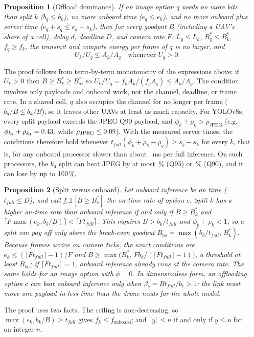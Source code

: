 \documentclass[journal,twocolumn,10pt]{IEEEtran}
\newtheorem{proposition}{Proposition}
\begin{document}
\begin{proposition}[Offload dominance]\label{prop:dominance}
If an image option $q$ needs no more bits than split $k$ ($b_q\le b_k$), no more onboard time ($e_q\le e_k$), and no more onboard plus server time ($e_q+s_q\le e_k+s_k$), then for every goodput $B$ (including a UAV's share of a cell), delay $d$, deadline $D$, and camera rate $F$: $L_q\le L_k$, $B^\ast_q\le B^\ast_k$, $f_q\ge f_k$, the transmit and compute energy per frame of $q$ is no larger, and
\[ U_k/U_q \le A_k/A_q \quad\text{whenever } U_q>0. \]
\end{proposition}
\noindent The proof follows from term-by-term monotonicity of the expressions above: if $U_k>0$ then $B\ge B^\ast_k\ge B^\ast_q$, so $U_k/U_q=f_kA_k/(f_qA_q)\le A_k/A_q$. The condition involves only payloads and onboard work, not the channel, deadline, or frame rate. In a shared cell, $q$ also occupies the channel for no longer per frame ($b_q/B\le b_k/B$), so it leaves other UAVs at least as much capacity. For YOLOv8s, every split payload exceeds the JPEG Q90 payload, and $\phi_k+\rho_k>\rho_{\mathrm{JPEG}}$ (e.g.\ $\phi_{k_4}+\rho_{k_4}=0.43$, while $\rho_{\mathrm{JPEG}}\le0.09$). With the measured server times, the conditions therefore hold whenever $t_{full}(\phi_k+\rho_k-\rho_q)\ge s_q-s_k$ for every $k$, that is, for any onboard processor slower than about \GenDominanceTmin~ms per full inference. On such processors, the $k_4$ split can beat JPEG by at most \GenAccBoundNinetyFivePct\,\% (Q95) or \GenAccBoundNinetyPct\,\% (Q90), and it can lose by up to 100\,\%.

\begin{proposition}[Split versus onboard]\label{prop:breakeven}
Let onboard inference be on time ($t_{full}\le D$), and call $f_c\mathbb{1}[B\ge B^\ast_c]$ the on-time rate of option $c$. Split $k$ has a higher on-time rate than onboard inference if and only if $B\ge B^\ast_k$ and $\lceil F\max(e_k,b_k/B)\rceil<\lceil F t_{full}\rceil$. This requires $B>b_k/t_{full}$ and $\phi_k+\rho_k<1$, so a split can pay off only above the break-even goodput $B_{\mathrm{be}}=\max(b_k/t_{full},\,B^\ast_k)$. Because frames arrive on camera ticks, the exact conditions are $e_k\le(\lceil F t_{full}\rceil-1)/F$ and $B\ge\max\big(B^\ast_k,\,F b_k/(\lceil F t_{full}\rceil-1)\big)$, a threshold at least $B_{\mathrm{be}}$; if $\lceil F t_{full}\rceil=1$, onboard inference already runs at the camera rate. The same holds for an image option with $\phi=0$. In dimensionless form, an offloading option $c$ can beat onboard inference only when $\beta_c = B t_{full}/b_c>1$: the link must move one payload in less time than the drone needs for the whole model.
\end{proposition}
\noindent The proof uses two facts. The ceiling is non-decreasing, so $\max(e_k,b_k/B)\ge t_{full}$ gives $f_k\le f_{\mathrm{onboard}}$; and $\lceil y\rceil\le n$ if and only if $y\le n$ for an integer $n$.
\end{document}
